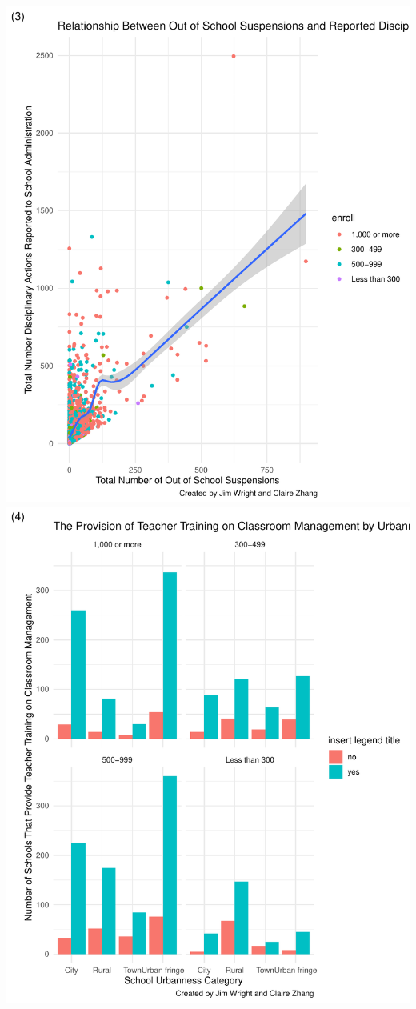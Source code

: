 \documentclass[man]{apa6}
\begin{document}
\includegraphics{Final-Project_Zhang_Wright_files/figure-latex/plots-3.pdf}
\includegraphics{Final-Project_Zhang_Wright_files/figure-latex/plots-4.pdf}
\end{document}
